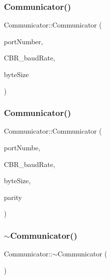 \mbox{\label{class_communicator_ac3274a4f40c669f4db2e7fe4f239d018}} 
\subsubsection{\texorpdfstring{Communicator()}{Communicator()}\hspace{0.1cm}{\footnotesize\ttfamily [2/3]}}
{\footnotesize\ttfamily Communicator\+::\+Communicator (\begin{DoxyParamCaption}\item[{uint8\+\_\+t}]{port\+Number,  }\item[{D\+W\+O\+RD}]{C\+B\+R\+\_\+baud\+Rate,  }\item[{byte}]{byte\+Size }\end{DoxyParamCaption})}

\mbox{\label{class_communicator_a86b21e90bb3c1c8afedcc2c1e523c79c}} 
\subsubsection{\texorpdfstring{Communicator()}{Communicator()}\hspace{0.1cm}{\footnotesize\ttfamily [3/3]}}
{\footnotesize\ttfamily Communicator\+::\+Communicator (\begin{DoxyParamCaption}\item[{uint8\+\_\+t}]{port\+Numbe,  }\item[{D\+W\+O\+RD}]{C\+B\+R\+\_\+baud\+Rate,  }\item[{byte}]{byte\+Size,  }\item[{byte}]{parity }\end{DoxyParamCaption})}

\mbox{\label{class_communicator_a4ced5362bf7438924f8d7f1b0c5ec391}} 
\subsubsection{\texorpdfstring{$\sim$\+Communicator()}{~Communicator()}}
{\footnotesize\ttfamily Communicator\+::$\sim$\+Communicator (\begin{DoxyParamCaption}{ }\end{DoxyParamCaption})}



